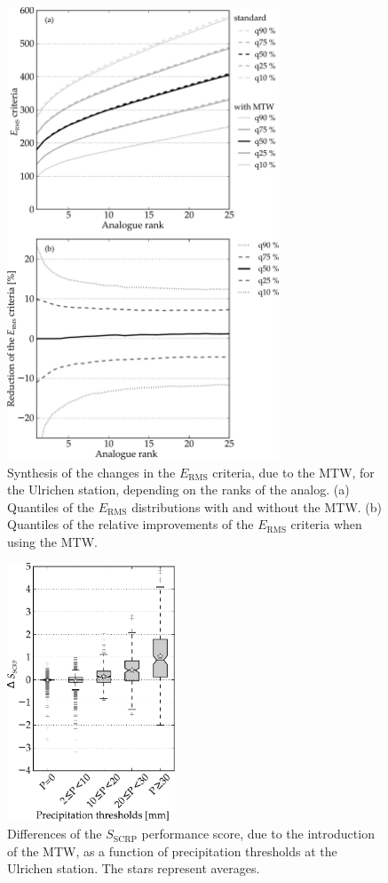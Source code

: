\documentclass[hess, manuscript]{copernicus}
\begin{document}
\begin{figure}[htb]
	\begin{center}
		\includegraphics[width=8.1cm]{figures/changes_RMSE_value_and_gain.pdf}
	\end{center}
	\caption{Synthesis of the changes in the $E_{\text{RMS}}$ criteria, due to the MTW, for the Ulrichen station, depending on the ranks of the analog. (a) Quantiles of the $E_{\text{RMS}}$ distributions with and without the MTW. (b) Quantiles of the relative improvements of the $E_{\text{RMS}}$ criteria when using the MTW.}
	\label{fig:changes_RMSE}
\end{figure}

\begin{figure}[htb]
	\includegraphics[width=5cm]{figures/changes_CRPS_precip_threshold.pdf}
	\caption{Differences of the $S_{\text{SCRP}}$ performance score, due to the introduction of the MTW, as a function of precipitation thresholds at the Ulrichen station. The stars represent averages.}
	\label{fig:changes_CRPS_precip_threshold}
\end{figure}
\end{document}
